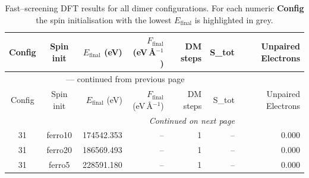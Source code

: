 
\begin{longtable}{@{}ccrrrrr@{}}
\caption{Fast–screening DFT results for all dimer configurations.
         For each numeric \textbf{Config} the spin initialisation with the
         lowest $E_{\mathrm{final}}$ is highlighted in grey.}\label{tab:dimer_full}\\
\toprule
Config & Spin init & $E_{\mathrm{final}}$ (eV) &
$F_{\mathrm{final}}$ (eV\,\AA$^{-1}$) & DM steps & S_{tot} & Unpaired Electrons\\
\midrule
\endfirsthead
\multicolumn{6}{c}{{\tablename}~\thetable{} — continued from previous page}\\
\toprule
Config & Spin init & $E_{\mathrm{final}}$ (eV) &
$F_{\mathrm{final}}$ (eV\,\AA$^{-1}$) & DM steps & S_{tot} & Unpaired Electrons\\
\midrule
\endhead
\midrule
\multicolumn{6}{r}{\emph{Continued on next page}}\\
\endfoot
\bottomrule
\endlastfoot
\rowcolor{gray!20} 31 & ferro10 & 174542.353 & -- & 1 & -- & 0.000 \\
31 & ferro20 & 186569.493 & -- & 1 & -- & 0.000 \\
31 & ferro5 & 228591.180 & -- & 1 & -- & 0.000 \\
\end{longtable}